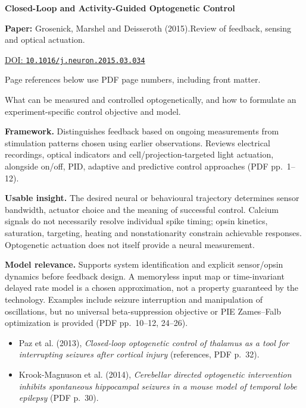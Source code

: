 

{\Large\bfseries Closed-Loop and Activity-Guided Optogenetic Control\par}

\textbf{Paper:} Grosenick, Marshel and Deisseroth (2015).\quad Review of feedback, sensing and optical actuation.\par
\href{https://doi.org/10.1016/j.neuron.2015.03.034}{DOI: \nolinkurl{10.1016/j.neuron.2015.03.034}}\par
{\footnotesize Page references below use PDF page numbers, including front matter.}

What can be measured and controlled optogenetically, and how to formulate an experiment-specific control objective and model.

\textbf{Framework.} Distinguishes feedback based on ongoing measurements from stimulation patterns chosen using earlier observations. Reviews electrical recordings, optical indicators and cell/projection-targeted light actuation, alongside on/off, PID, adaptive and predictive control approaches (PDF pp.~1--12).

\textbf{Usable insight.} The desired neural or behavioural trajectory determines sensor bandwidth, actuator choice and the meaning of successful control. Calcium signals do not necessarily resolve individual spike timing; opsin kinetics, saturation, targeting, heating and nonstationarity constrain achievable responses. Optogenetic actuation does not itself provide a neural measurement.

\textbf{Model relevance.} Supports system identification and explicit sensor/opsin dynamics before feedback design. A memoryless input map or time-invariant delayed rate model is a chosen approximation, not a property guaranteed by the technology. Examples include seizure interruption and manipulation of oscillations, but no universal beta-suppression objective or PIE Zames--Falb optimization is provided (PDF pp.~10--12, 24--26).

\begin{itemize}
\item Paz et al. (2013), \emph{Closed-loop optogenetic control of thalamus as a tool for interrupting seizures after cortical injury} (references, PDF p.~32).
\item Krook-Magnuson et al. (2014), \emph{Cerebellar directed optogenetic intervention inhibits spontaneous hippocampal seizures in a mouse model of temporal lobe epilepsy} (PDF p.~30).
\end{itemize}


